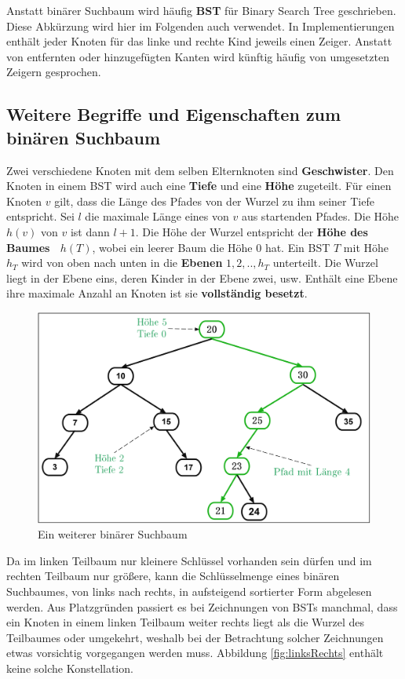 \documentclass[a4paper,12pt]{article}
\begin{document}
\noindent Anstatt binärer Suchbaum wird häufig \textbf{BST} für Binary Search Tree geschrieben. Diese Abkürzung wird hier im Folgenden auch verwendet. In Implementierungen enthält jeder Knoten für das linke und rechte Kind jeweils einen Zeiger. Anstatt von entfernten oder hinzugefügten Kanten wird künftig häufig von umgesetzten Zeigern gesprochen. 	
\subsection{Weitere Begriffe und Eigenschaften zum binären Suchbaum}	
\noindent Zwei verschiedene Knoten mit dem selben Elternknoten sind \textbf{Geschwister}. Den Knoten in einem BST wird auch eine \textbf{Tiefe} und eine \textbf{Höhe} zugeteilt. Für einen Knoten $v$ gilt, dass die Länge des Pfades von der Wurzel zu ihm seiner Tiefe entspricht. Sei $l$ die maximale Länge eines von $v$ aus startenden Pfades. Die Höhe $\mathit{h(v)}$ von $v$ ist dann $l+1$. Die Höhe der Wurzel entspricht der \textbf{Höhe des Baumes~ $h(T)$}, wobei ein leerer Baum die Höhe $0$ hat. Ein BST $T$ mit Höhe $h_T$ wird von oben nach unten in die \textbf{Ebenen} $1,2,..,h_T$ unterteilt. Die Wurzel liegt in der Ebene eins, deren Kinder in der Ebene zwei, usw. Enthält eine Ebene ihre maximale Anzahl an Knoten ist sie \textbf{vollständig besetzt}.
\begin{figure}[H]
	\centering
	\includegraphics[width= 1\textwidth]{Medien/Einleitung/suchbaum2_2}
	\caption{Ein weiterer binärer Suchbaum }
	\label{fig:suchbaum2_2}
\end{figure}

\noindent Da im linken Teilbaum nur kleinere Schlüssel vorhanden sein dürfen und im rechten Teilbaum nur größere, kann die Schlüsselmenge eines binären Suchbaumes, von links nach rechts, in aufsteigend sortierter Form abgelesen werden. Aus Platzgründen passiert es bei Zeichnungen von BSTs manchmal, dass ein Knoten in einem linken Teilbaum weiter rechts liegt als die Wurzel des Teilbaumes oder umgekehrt, weshalb bei der Betrachtung solcher Zeichnungen etwas vorsichtig vorgegangen werden muss. Abbildung \ref{fig:linksRechts} enthält keine solche Konstellation.  
\end{document}

